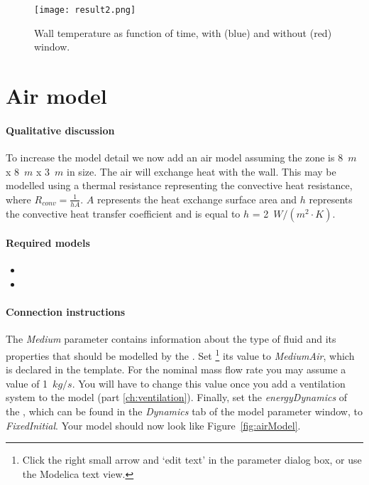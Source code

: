 \documentclass[10pt,a4paper]{article}
\begin{document}
\begin{figure}[h!]
\centering
\texttt{[image: result2.png]}
\caption{Wall temperature as function of time,
with (blue) and without (red) window.}
\label{fig:res2}
\end{figure}

\newpage

\section{Air model}
\paragraph{Qualitative discussion}
To increase the model detail we now add
an air model assuming the zone is 8~$m$ x 8~$m$ x 3~$m$ in size.
The air will exchange heat with the wall.
This may be modelled using a thermal resistance representing the convective heat resistance,
where $R_{conv}=\frac{1}{hA}$. $A$ represents the heat exchange 
surface area and $h$ represents the convective heat transfer coefficient and is equal to $h$ = 2~${W/(m^2\cdot K)}$.

\paragraph{Required models}
\begin{itemize}
\item {}
\item {}
\end{itemize}

\paragraph{Connection instructions}
The  \textit{Medium} parameter contains
information about the type of fluid and its properties
that should be modelled by the .
Set
\footnote{Click the right small arrow and `edit text' in the parameter dialog box, or use the Modelica text view.}
its value to \textit{MediumAir}, which is declared in the template. For the nominal mass flow rate you may assume a value of 1~$kg/s$. You will have to change this value once you add a ventilation system to the model (part \ref{ch:ventilation}). Finally, set the \textit{energyDynamics} of the , which can be found in the \textit{Dynamics} tab of the model parameter window, to \textit{FixedInitial}. Your model should now look like Figure~\ref{fig:airModel}.
 
\end{document}
